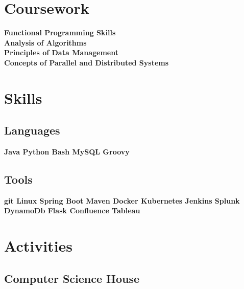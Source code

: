 \documentclass[]{deedy-resume-openfont}
\begin{document}
\begin{minipage}[t]{0.30\textwidth}

\section{Coursework}
\textbf{
 Functional Programming Skills \\
  Analysis of Algorithms \\
  Principles of Data Management \\
  Concepts of Parallel and Distributed Systems
}


\section{Skills}
\subsection{Languages}
\textbf{Java \textbullet{} Python \textbullet{} Bash \textbullet{} MySQL
Groovy\\}

\vspace{\topsep} %

\subsection{Tools}
\textbf{ git \textbullet{} Linux \textbullet{} Spring Boot \textbullet{} Maven
Docker \textbullet{} Kubernetes  \textbullet{} Jenkins
Splunk \textbullet{} DynamoDb \textbullet{} Flask 
Confluence \textbullet{} Tableau}
\sectionsep


\section{Activities}

\subsection{Computer Science House}


\end{minipage}
\end{document}
